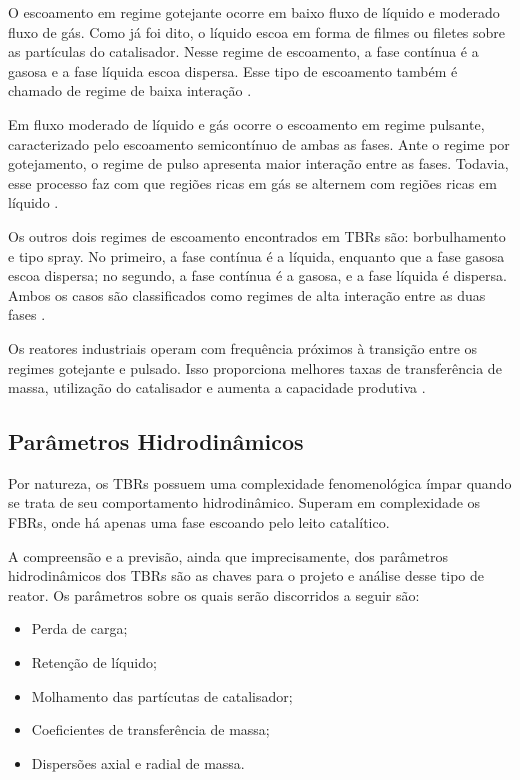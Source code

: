 O escoamento em regime gotejante ocorre em baixo fluxo de líquido e moderado
fluxo de gás. Como já foi dito, o líquido escoa em forma de filmes ou filetes
sobre as partículas do catalisador. Nesse regime de escoamento, a fase contínua
é a gasosa e a fase líquida escoa dispersa. Esse tipo de escoamento também é
chamado de regime de baixa interação \cite{Saroha1996}.

Em fluxo moderado de líquido e gás ocorre o escoamento em regime pulsante,
caracterizado pelo escoamento semicontínuo de ambas as fases. Ante o regime
por gotejamento, o regime de pulso apresenta maior interação entre as fases.
Todavia, esse processo faz com que regiões ricas em gás se alternem com regiões
ricas em líquido \cite{Saroha1996}.

Os outros dois regimes de escoamento encontrados em TBRs são: borbulhamento e
tipo spray. No primeiro, a fase contínua é a líquida, enquanto que a fase gasosa
escoa dispersa; no segundo, a fase contínua é a gasosa, e a fase líquida é
dispersa. Ambos os casos são classificados como regimes de alta interação entre
as duas fases \cite{Saroha1996}.

Os reatores industriais operam com frequência próximos à transição entre os
regimes gotejante e pulsado. Isso proporciona melhores taxas de transferência de
massa, utilização do catalisador e aumenta a capacidade produtiva
\cite{Ancheyta2011}.

\subsection{Parâmetros Hidrodinâmicos}
\label{sec:parametroshidrodinamicos}

Por natureza, os TBRs possuem uma complexidade fenomenológica ímpar quando se
trata de seu comportamento hidrodinâmico. Superam em complexidade os FBRs,
onde há apenas uma fase escoando pelo leito catalítico. 

A compreensão e a previsão, ainda que imprecisamente, dos parâmetros
hidrodinâmicos dos TBRs são as chaves para o projeto e análise desse tipo de
reator. Os parâmetros sobre os quais serão discorridos a seguir são:

\begin{itemize}
  \item Perda de carga;
  \item Retenção de líquido;
  \item Molhamento das partícutas de catalisador;
  \item Coeficientes de transferência de massa;
  \item Dispersões axial e radial de massa.
\end{itemize}

